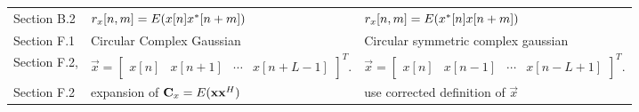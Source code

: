 \documentclass[a4paper, openany, oneside]{memoir}
\begin{document}
{\begin{tabularx}{\linewidth}{L{3cm}L{6cm}L{6cm}}
    Section B.2 & $r_x[n,m]=E(x[n]x^*[n+m])$ & $r_x[n,m]=E(x^*[n]x[n+m])$ \\
    Section F.1 & Circular Complex Gaussian & Circular symmetric complex gaussian \\
    Section F.2, &$\vec{x} = \begin{bmatrix}x[n]& x[n+1]& \cdots& x[n+L-1]\end{bmatrix}^T.$ & $
    \vec{x} = \begin{bmatrix}x[n]& x[n-1]& \cdots& x[n-L+1]\end{bmatrix}^T.$ \\
    Section F.2 & expansion of $\boldsymbol{\mathbf{C}}_x = E(\boldsymbol{\mathbf{x}}\boldsymbol{\mathbf{x}}^H)$ & use corrected definition of $\vec{x}$ 
\end{tabularx}
}
\end{document}
